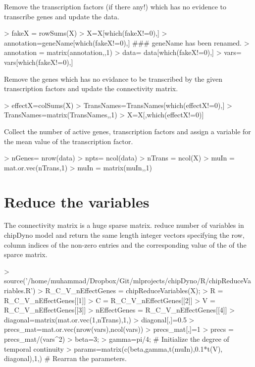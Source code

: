 \documentclass{article}
\begin{document}
Remove the transcription factors (if there any!) which has no evidence to transcribe genes and update the data.
\begin{Schunk}
\begin{Sinput}
> fakeX = rowSums(X)
> X=X[which(fakeX!=0),]
> annotation=geneName[which(fakeX!=0),] ### geneName has been renamed.
> annotation = matrix(annotation,,1)
> data= data[which(fakeX!=0),]
> vars= vars[which(fakeX!=0),]
\end{Sinput}
\end{Schunk}


Remove the genes which has no evidance to be transcribed by the given transcription factors and update the connectivity matrix.
\begin{Schunk}
\begin{Sinput}
> effectX=colSums(X)
> TransNames=TransNames[which(effectX!=0),]
> TransNames=matrix(TransNames,,1)
> X=X[,which(effectX!=0)]
\end{Sinput}
\end{Schunk}


Collect the number of active genes, transcription factors and assign a variable for the mean value of the transcription factor.
\begin{Schunk}
\begin{Sinput}
> nGenes= nrow(data)
> npts= ncol(data)
> nTrans = ncol(X)
> muIn = mat.or.vec(nTrans,1)
> muIn = matrix(muIn,,1)
\end{Sinput}
\end{Schunk}

\section{Reduce the variables}
The connectivity matrix is a huge sparse matrix.  reduce  number of variables in chipDyno model and return the same length integer vectors specifying the row, column 
indices of the non-zero entries and the corresponding value of the of the sparce matrix.
\begin{Schunk}
\begin{Sinput}
> source('/home/muhammad/Dropbox/Git/mlprojects/chipDyno/R/chipReduceVariables.R')
> R_C_V_nEffectGenes = chipReduceVariables(X);
> R = R_C_V_nEffectGenes[[1]]
> C = R_C_V_nEffectGenes[[2]]
> V = R_C_V_nEffectGenes[[3]]
> nEffectGenes = R_C_V_nEffectGenes[[4]]
> diagonal=matrix(mat.or.vec(1,nTrans),1,)
> diagonal[,]=0.5
> precs_mat=mat.or.vec(nrow(vars),ncol(vars))
> precs_mat[,]=1
> precs = precs_mat/(vars^2)
> beta=3;
> gamma=pi/4; # Initialize the degree of temporal continuity
> params=matrix(c(beta,gamma,t(muIn),0.1*t(V), diagonal),1,) # Rearran the parameters.
\end{Sinput}
\end{Schunk}
\end{document}
